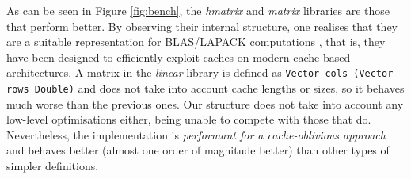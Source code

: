 \documentclass[sigplan,screen]{acmart}
\newcommand{\hs}{\texttt}
\begin{document}
As can be seen in Figure \ref{fig:bench}, the \emph{hmatrix} and \emph{matrix} libraries are those that perform better. By observing their internal structure, one realises that they are a suitable representation for BLAS/LAPACK computations \cite{anderson1999lapack}, that is, they have been designed to efficiently exploit caches on modern cache-based architectures. A matrix in the \emph{linear} library is defined as \hs{Vector cols (Vector rows Double)} and does not take into account cache lengths or sizes, so it behaves much worse than the previous ones. Our structure does not take into account any low-level optimisations either, being unable to compete with those that do. Nevertheless, the implementation is \emph{performant for a cache-oblivious approach} and behaves better (almost one order of magnitude better) than other types of simpler definitions.


%
\end{document}

